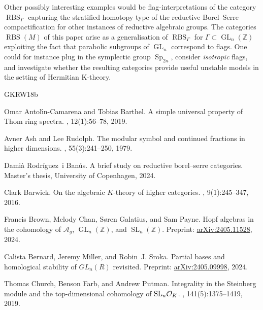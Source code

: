 \documentclass[12pt, reqno]{amsart}
\theoremstyle{plain}
\theoremstyle{definition}
\newcommand{\Z}{\mathbb Z}
\begin{document}
Other possibly interesting examples would be flag-interpretations of the category $\operatorname{RBS}_\Gamma$ capturing the stratified homotopy type of the reductive Borel--Serre compactification for other instances of reductive algebraic groups. The categories $\operatorname{RBS}(M)$ of this paper arise as a generalisation of $\operatorname{RBS}_\Gamma$ for $\Gamma\subset\operatorname{GL}_n(\Z)$ exploiting the fact that parabolic subgroups of $\operatorname{GL}_n$ correspond to flags. One could for instance plug in the symplectic group $\operatorname{Sp}_{2n}$, consider \textit{isotropic} flags, and investigate whether the resulting categories provide useful unstable models in the setting of Hermitian K-theory. 





\begin{thebibliography}{GKRW18b}

Omar Antol\'{\i}n-Camarena and Tobias Barthel.
\newblock A simple universal property of {T}hom ring spectra.
, 12(1):56--78, 2019.

Avner Ash and Lee Rudolph.
\newblock The modular symbol and continued fractions in higher dimensions.
, 55(3):241--250, 1979.

Damià Rodríguez~i Banús.
\newblock A brief study on reductive borel--serre categories.
\newblock Master's thesis, University of Copenhagen, 2024.

Clark Barwick.
\newblock On the algebraic {$K$}-theory of higher categories.
, 9(1):245--347, 2016.

Francis Brown, Melody Chan, Søren Galatius, and Sam Payne.
\newblock Hopf algebras in the cohomology of {$\mathcal{A}_g$},
  {$\operatorname{GL}_n(\mathbb{Z})$}, and {$\operatorname{SL}_n(\mathbb{Z})$}.
\newblock Preprint:
  \href{https://arxiv.org/pdf/2405.11528.pdf}{arXiv:2405.11528}, 2024.

Calista Bernard, Jeremy Miller, and Robin~J. Sroka.
\newblock Partial bases and homological stability of ${GL_n(R)}$ revisited.
\newblock Preprint:
  \href{https://arxiv.org/abs/math/2405.09998}{arXiv:2405.09998}, 2024.

Thomas Church, Benson Farb, and Andrew Putman.
\newblock Integrality in the {S}teinberg module and the top-dimensional
  cohomology of {${\rm SL}_n\mathcal{O}_K$}.
, 141(5):1375--1419, 2019.


\end{thebibliography}
\end{document}
